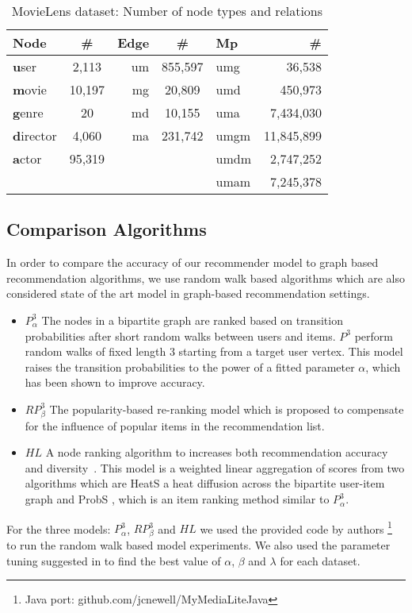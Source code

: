 \documentclass {acmart}
\begin{document}
   
   \begin{table}[ht]
  \centering
  \caption{MovieLens dataset: Number of node types and relations  }
  \label{c}
  \begin{tabular}{l|c||r|c ||l|r}
    Node & \# & Edge & \# & Mp & \#\\
    \hline
    \textbf{u}ser  & 2,113 & um & 855,597 &umg & 36,538\\
    \textbf{m}ovie  & 10,197 & mg & 20,809 &umd & 450,973\\
    \textbf{g}enre  & 20 & md & 10,155 & uma& 7,434,030\\
    \textbf{d}irector  & 4,060 & ma & 231,742 &umgm & 11,845,899\\
    \textbf{a}ctor  & 95,319 &  & & umdm& 2,747,252\\
      &  &  & & umam& 7,245,378\\
  \end{tabular}
\end{table} 

 
\subsection{Comparison Algorithms}

In order to compare the accuracy of our recommender  model to graph based recommendation algorithms, we use random walk based algorithms which are also considered state of the art model in graph-based recommendation settings.

\begin{itemize}

\item \textit{ $P_{\alpha}^3$} \cite{Christoffel:2015:BWA:2792838.2800180}
The nodes in a bipartite  graph are ranked based on transition probabilities after short random walks between users and items. $P^3$ perform random walks of fixed length 3
 starting from a target user vertex. This model raises the transition probabilities to the power of a fitted parameter $\alpha$, which has been shown to improve accuracy.
 
\item \textit{$RP_{\beta}^3$} The popularity-based re-ranking model which is proposed \cite{Christoffel:2015:BWA:2792838.2800180} to compensate for the influence of  popular items in the recommendation list. 

\item \textit{$HL$} A node ranking algorithm to increases both recommendation accuracy and diversity~\cite{Christoffel:2015:BWA:2792838.2800180}. This model is a weighted linear aggregation of scores from two algorithms which are HeatS \cite{zhou2010solving} a heat diffusion across the bipartite user-item graph and ProbS \cite{zhou2010solving}, which is an item ranking method similar to $P_{\alpha}^3$.
\end{itemize}
For the  three models:{ $P_{\alpha}^3$}, {$RP_{\beta}^3$} and {$HL$}  we used the provided  code by authors \footnote{Java port: github.com/jcnewell/MyMediaLiteJava} to run the random walk based model experiments. We also used the parameter tuning suggested in \cite{Christoffel:2015:BWA:2792838.2800180} to find the best value of $\alpha$, $\beta$ and $\lambda$ for each dataset. 
\end{document}
